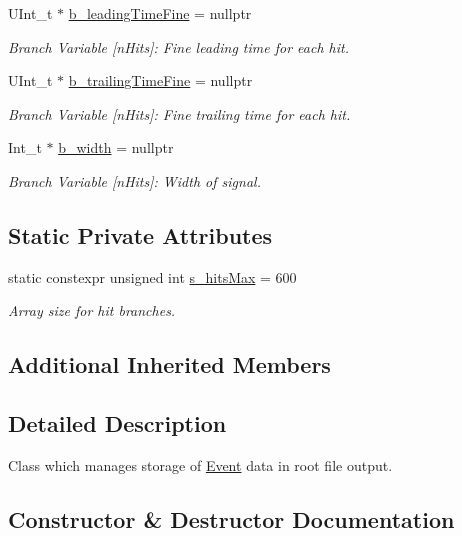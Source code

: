 \begin{DoxyCompactItemize}
U\+Int\+\_\+t $\ast$ \hyperlink{class_event_tree_manager_af2d628b1f5c54595b2f2b618b175af6f}{b\+\_\+leading\+Time\+Fine} = nullptr
\begin{DoxyCompactList}\small\item\em Branch Variable \mbox{[}n\+Hits\mbox{]}\+: Fine leading time for each hit. \end{DoxyCompactList}\item 
U\+Int\+\_\+t $\ast$ \hyperlink{class_event_tree_manager_a6c06cd342910a86ac1db079dfd7c5da2}{b\+\_\+trailing\+Time\+Fine} = nullptr
\begin{DoxyCompactList}\small\item\em Branch Variable \mbox{[}n\+Hits\mbox{]}\+: Fine trailing time for each hit. \end{DoxyCompactList}\item 
Int\+\_\+t $\ast$ \hyperlink{class_event_tree_manager_aa65fec5d7e3a3b3983730033a6a4a7b8}{b\+\_\+width} = nullptr
\begin{DoxyCompactList}\small\item\em Branch Variable \mbox{[}n\+Hits\mbox{]}\+: Width of signal. \end{DoxyCompactList}\end{DoxyCompactItemize}
\subsection*{Static Private Attributes}
\begin{DoxyCompactItemize}
\item 
static constexpr unsigned int \hyperlink{class_event_tree_manager_aab35ad52374d52149bde894c8af7a8c5}{s\+\_\+hits\+Max} = 600
\begin{DoxyCompactList}\small\item\em Array size for hit branches. \end{DoxyCompactList}\end{DoxyCompactItemize}
\subsection*{Additional Inherited Members}


\subsection{Detailed Description}
Class which manages storage of \hyperlink{class_event}{Event} data in root file output. 

\subsection{Constructor \& Destructor Documentation}
\mbox{\label{class_event_tree_manager_ac56641a71c28863d76fcc598ac8e32df}} 
